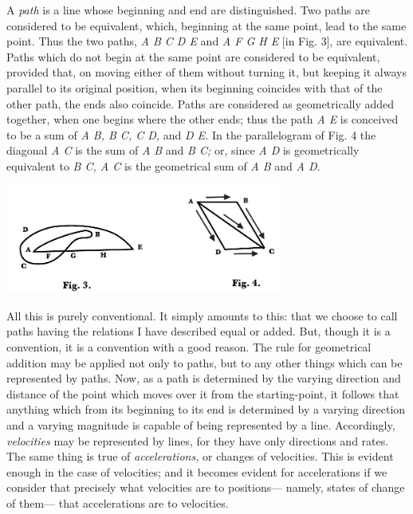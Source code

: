 A \emph{path} is a line whose beginning and end are distinguished. Two paths are considered to be equivalent, which, beginning at the same point, lead to the same point. Thus the two paths, \emph{A B C D E} and \emph{A F G H E} [in Fig. 3], are equivalent. Paths which do not begin at the same point are considered to be equivalent, provided that, on moving either of them without turning it, but keeping it always parallel to its original position, when its beginning coincides with that of the other path, the ends also coincide. Paths are considered as geometrically added together, when one begins where the other ends; thus the path \emph{A E} is conceived to be a sum of \emph{A B, B C, C D,} and \emph{D E.} In the parallelogram of Fig. 4 the diagonal \emph{A C} is the sum of \emph{A B} and \emph{B C;} or, since \emph{A D} is geometrically equivalent to \emph{B C, A C} is the geometrical sum of \emph{A B} and \emph{A D.}

\centerline{\includegraphics[width=3.6in]{peirce-howto2.pdf}}

All this is purely conventional. It simply amounts to this: that we choose to call paths having the relations I have described equal or added. But, though it is a convention, it is a convention with a good reason. The rule for geometrical addition may be applied not only to paths, but to any other things which can be represented by paths. Now, as a path is determined by the varying direction and distance of the point which moves over it from the starting-point, it follows that anything which from its beginning to its end is determined by a varying direction and a varying magnitude is capable of being represented by a line. Accordingly, \emph{velocities} may be represented by lines, for they have only directions and rates. The same thing is true of \emph{accelerations,} or changes of velocities. This is evident enough in the case of velocities; and it becomes evident for accelerations if we consider that precisely what velocities are to positions--- namely, states of change of them--- that accelerations are to velocities.



